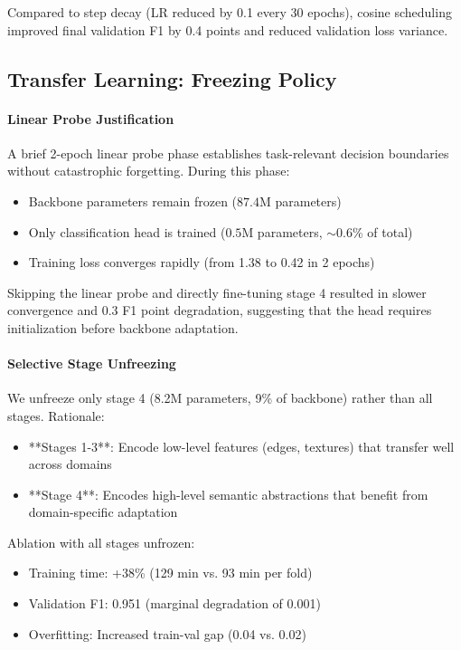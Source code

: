 \documentclass[11pt,a4paper]{article}
\begin{document}
Compared to step decay (LR reduced by 0.1 every 30 epochs), cosine scheduling improved final validation F1 by 0.4 points and reduced validation loss variance.

\subsection{Transfer Learning: Freezing Policy}

\paragraph{Linear Probe Justification} A brief 2-epoch linear probe phase establishes task-relevant decision boundaries without catastrophic forgetting. During this phase:
\begin{itemize}[leftmargin=*]
\item Backbone parameters remain frozen (\(87.4\)M parameters)
\item Only classification head is trained (\(0.5\)M parameters, \(\sim\)0.6\% of total)
\item Training loss converges rapidly (from 1.38 to 0.42 in 2 epochs)
\end{itemize}

Skipping the linear probe and directly fine-tuning stage 4 resulted in slower convergence and 0.3 F1 point degradation, suggesting that the head requires initialization before backbone adaptation.

\paragraph{Selective Stage Unfreezing} We unfreeze only stage 4 (8.2M parameters, 9\% of backbone) rather than all stages. Rationale:
\begin{itemize}[leftmargin=*]
\item **Stages 1-3**: Encode low-level features (edges, textures) that transfer well across domains
\item **Stage 4**: Encodes high-level semantic abstractions that benefit from domain-specific adaptation
\end{itemize}

Ablation with all stages unfrozen:
\begin{itemize}[leftmargin=*]
\item Training time: +38\% (129 min vs. 93 min per fold)
\item Validation F1: 0.951 (marginal degradation of 0.001)
\item Overfitting: Increased train-val gap (0.04 vs. 0.02)
\end{itemize}
\end{document}
